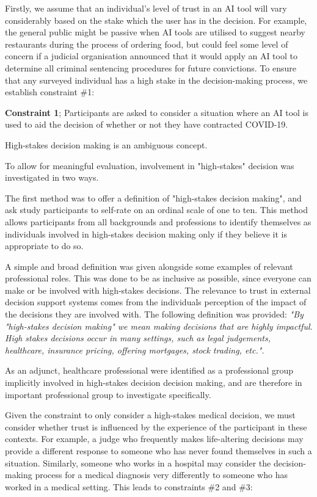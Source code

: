 \documentclass[manuscript,screen,review]{acmart}
\begin{document}
 Firstly, we assume that an individual's level of trust in an AI tool will vary considerably based on the stake which the user has in the decision. For example, the general public might be passive when AI tools are utilised to suggest nearby restaurants during the process of ordering food, but could feel some level of concern if a judicial organisation announced that it would apply an AI tool to determine all criminal sentencing procedures for future convictions. To ensure that any surveyed individual has a high stake in the decision-making process, we establish constraint \#1:
 \begin{center}
     \textbf{Constraint 1}; Participants are asked to consider a situation where an AI tool is used to aid the decision of whether or not they have contracted COVID-19.
 \end{center}

High-stakes decision making is an ambiguous concept.

To allow for meaningful evaluation, involvement in "high-stakes" decision was investigated in two ways.

The first method was to offer a definition of "high-stakes decision making", and ask study participants to self-rate on an ordinal scale of one to ten. This method allows participants from all backgrounds and professions to identify themselves as individuals involved in high-stakes decision making only if they believe it is appropriate to do so. 

A simple and broad definition was given alongside some examples of relevant professional roles. This was done to be as inclusive as possible, since everyone can make or be involved with high-stakes decisions. The relevance to trust in external decision support systems comes from the individuals perception of the impact of the decisions they are involved with. The following definition was provided:
\textit{"By "high-stakes decision making" we mean making decisions that are highly impactful. High stakes decisions occur in many settings, such as legal judgements, healthcare, insurance pricing, offering mortgages, stock trading, etc.".}



As an adjunct, healthcare professional were identified as a professional group implicitly involved in high-stakes decision decision making, and are therefore in important professional group to investigate specifically.

Given the constraint to only consider a high-stakes medical decision, we must consider whether trust is influenced by the experience of the participant in these contexts. For example, a judge who frequently makes life-altering decisions may provide a different response to someone who has never found themselves in such a situation. Similarly, someone who works in a hospital may consider the decision-making process for a medical diagnosis very differently to someone who has worked in a medical setting. This leads to constraints \#2 and \#3:
 
\end{document}
